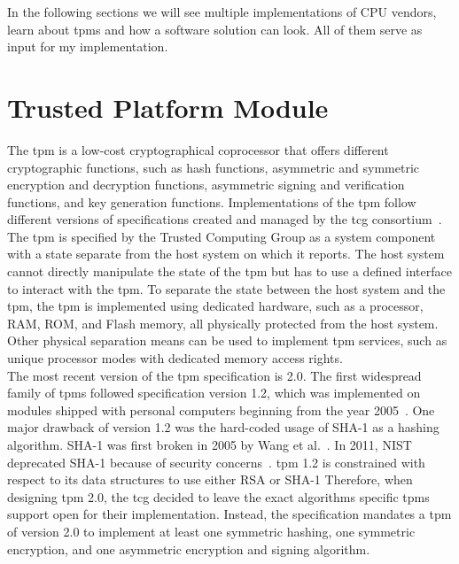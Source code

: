 In the following sections we will see multiple implementations of CPU vendors,
learn about \glspl{tpm} and how a software solution can look. All of them serve
as input for my implementation.

\section{Trusted Platform Module}
\label{sec:20:tpm}
The \gls{tpm} is a low-cost cryptographical coprocessor that offers different
cryptographic functions, such as hash functions, asymmetric and symmetric
encryption and decryption functions, asymmetric signing and verification
functions, and key generation functions. Implementations of the \gls{tpm} follow
different versions of specifications created and managed by the \gls{tcg}
consortium~\cite{tpm_architecture}. The \gls{tpm} is specified by the Trusted
Computing Group as a system component with a state separate from the host system
on which it reports. The host system cannot directly manipulate the state of the
\gls{tpm} but has to use a defined interface to interact with the \gls{tpm}. To
separate the state between the host system and the \gls{tpm}, the \gls{tpm} is
implemented using dedicated hardware, such as a processor, RAM, ROM, and Flash
memory, all physically protected from the host system. Other physical separation
means can be used to implement \gls{tpm} services, such as unique processor
modes with dedicated memory access rights.\\

The most recent version of the \gls{tpm} specification is 2.0. The first
widespread family of \glspl{tpm} followed specification version 1.2, which was
implemented on modules shipped with personal computers beginning from the year
2005~\cite{arthur2015practical}. One major drawback of version 1.2 was the
hard-coded usage of SHA-1 as a hashing algorithm. SHA-1 was first broken in 2005
by Wang et al.~\cite{wang2005collision}. In 2011, NIST deprecated SHA-1 because
of security concerns~\cite{nist-sha1}. \gls{tpm} 1.2 is constrained with respect
to its data structures to use either RSA or SHA-1\cite{tpm_architecture}
Therefore, when designing \gls{tpm} 2.0, the \gls{tcg} decided to leave the
exact algorithms specific \glspl{tpm} support open for their implementation.
Instead, the specification mandates a \gls{tpm} of version 2.0 to implement at
least one symmetric hashing, one symmetric encryption, and one asymmetric
encryption and signing algorithm. \\

